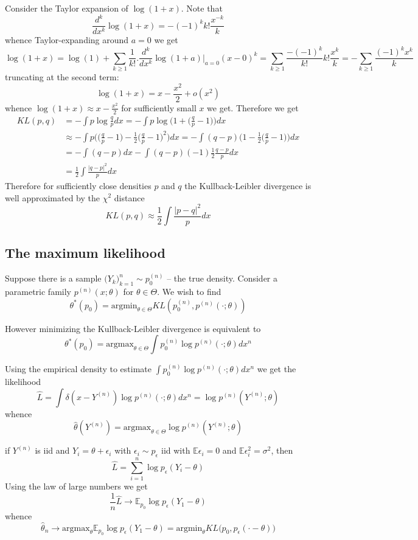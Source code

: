 \documentclass[a4paper]{article}
\newcommand{\Ex}{\mathbb{E}}
\begin{document}
Consider the Taylor expansion of $\log(1+x)$. Note that 
\[\frac{d^k}{dx^k} \log(1+x) = -(-1)^kk!\frac{x^{-k}}{k}\]
whence Taylor-expanding around $a=0$ we get
\[\log(1+x) = \log(1) + \sum_{k\geq1} \frac{1}{k!}\bigg.\frac{d^k}{dx^k} \log(1+a)\bigg\rvert_{a=0} (x-0)^k = \sum_{k\geq1} \frac{-(-1)^k}{k!}k!\frac{x^k}{k} = -\sum_{k\geq1} \frac{(-1)^kx^k}{k}\]
truncating at the second term:
\[\log(1+x) = x - \frac{x^2}{2} + o(x^2) \]
whence $\log(1+x)\approx x-\frac{x^2}{2}$ for sufficiently small $x$ we get.
Therefore we get
\begin{align*}
	KL(p,q) &= -\int p\log\frac{q}{p}dx = -\int p \log \Big(1+\big(\frac{q}{p}-1\big)\Big) dx \\
	& \approx -\int p \Big(\big(\frac{q}{p}-1\big) - \frac{1}{2} \big(\frac{q}{p}-1\big)^2 \Big) dx = -\int (q-p) \Big(1 - \frac{1}{2} \big(\frac{q}{p}-1\big) \Big) dx \\
	& = -\int (q-p) dx - \int (q-p) (-1) \frac{1}{2} \frac{q-p}{p} dx\\
	& = \frac{1}{2}\int \frac{|q-p|^2}{p} dx
\end{align*}
Therefore for sufficiently close densities $p$ and $q$ the Kullback-Leibler divergence is well approximated by the $\chi^2$ distance
\[KL(p,q) \approx \frac{1}{2}\int \frac{|p-q|^2}{p}dx\]


\subsection{The maximum likelihood} %
\label{sub:the_maximum_likelihood}

Suppose there is a sample $\big(Y_k\big)_{k=1}^n\sim p^{(n)}_0$ -- the true density. Consider a parametric family $p^{(n)}(x;\theta)$ for $\theta\in \Theta$.
We wish to find 
\[\theta^*(p_0)=\text{argmin}_{\theta\in \Theta} KL(p^{(n)}_0, p^{(n)}(\cdot;\theta))\]

However minimizing the Kullback-Leibler divergence is equivalent to 
\[\theta^*(p_0)=\text{argmax}_{\theta\in \Theta} \int p^{(n)}_0 \log p^{(n)}(\cdot;\theta) dx^n\]

Using the empirical density to estimate $\int p^{(n)}_0 \log p^{(n)}(\cdot;\theta) dx^n$ we get the likelihood
\[\hat{L} = \int \delta(x-Y^{(n)}) \log p^{(n)}(\cdot;\theta) dx^n = \log p^{(n)}(Y^{(n)};\theta)\]
whence 
\[\hat{\theta}(Y^{(n)}) = \text{argmax}_{\theta\in \Theta} \log p^{(n)}(Y^{(n)};\theta)\]

if $Y^{(n)}$ is iid and $Y_i = \theta + \epsilon_i$ with $\epsilon_i\sim p_\epsilon$ iid with $\Ex \epsilon_i = 0$ and $\Ex \epsilon_i^2 = \sigma^2$, then
\[\hat{L} = \sum_{i=1}^n\log p_\epsilon(Y_i-\theta)\]
Using the law of large numbers we get
\[\frac{1}{n}\hat{L} \to \Ex_{p_0}\log p_\epsilon(Y_1-\theta)\]
whence
\[\hat{\theta}_n \to \text{argmax}_{\theta}\Ex_{p_0}\log p_\epsilon(Y_1-\theta) = \text{argmin}_{\theta} KL\Big(p_0,p_\epsilon(\cdot - \theta)\Big)\]
\end{document}
